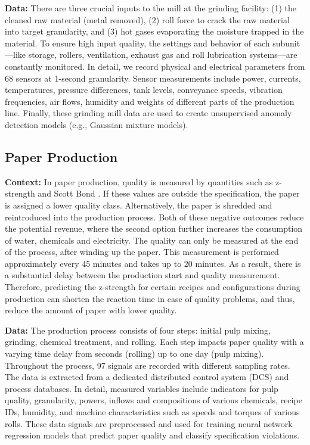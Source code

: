 \documentclass[sigconf,screen]{acmart}
\begin{document}
\textbf{Data:} There are three crucial inputs to the mill at the grinding facility: (1) the cleaned raw material (metal removed), (2) roll force to crack the raw material into target granularity, and (3) hot gases evaporating the moisture trapped in the material. To ensure high input quality, the settings and behavior of each subunit---like storage, rollers, ventilation, exhaust gas and roll lubrication systems---are constantly monitored. In detail, we record physical and electrical parameters from 68 sensors at 1-second granularity. Sensor measurements include power, currents, temperatures, pressure differences, tank levels, conveyance speeds, vibration frequencies, air flows, humidity and weights of different parts of the production line. Finally, these grinding mill data are used to create unsupervised anomaly detection models (e.g., Gaussian mixture models).

\subsection{Paper Production}
\label{sec:paper}

\textbf{Context:} In paper production, quality is measured by quantities such as z-strength and Scott Bond \cite{ztestscott}. If these values are outside the specification, the paper is assigned a lower quality class. Alternatively, the paper is shredded and reintroduced into the production process. Both of these negative outcomes reduce the potential revenue, where the second option further increases the consumption of water, chemicals and electricity. The quality can only be measured at the end of the process, after winding up the paper. This measurement is performed approximately every 45 minutes and takes up to 20 minutes. As a result, there is a substantial delay between the production start and quality measurement. Therefore, predicting the z-strength for certain recipes and configurations during production can shorten the reaction time in case of quality problems, and thus, reduce the amount of paper with lower quality.

\textbf{Data:} The production process consists of four steps: initial pulp mixing, grinding, chemical treatment, and rolling. Each step impacts paper quality with a varying time delay from seconds (rolling) up to one day (pulp mixing). Throughout the process, 97 signals are recorded with different sampling rates. The data is extracted from a dedicated distributed control system (DCS) and process databases. In detail, measured variables include indicators for pulp quality, granularity, powers, inflows and compositions of various chemicals, recipe IDs, humidity, and machine characteristics such as speeds and torques of various rolls. These data signals are preprocessed and used for training neural network regression models that predict paper quality and classify specification violations. 
\end{document}
